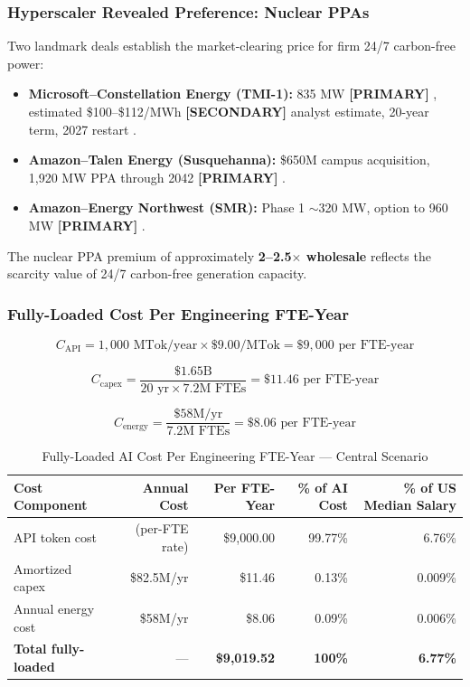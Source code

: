 \documentclass{article}
\newcommand{\PRIMARY}{\textbf{[PRIMARY]}}
\newcommand{\SECONDARY}{\textbf{[SECONDARY]}}
\begin{document}
\subsubsection*{Hyperscaler Revealed Preference: Nuclear PPAs}

Two landmark deals establish the market-clearing price for firm 24/7 carbon-free power:

\begin{itemize}
  \item \textbf{Microsoft--Constellation Energy (TMI-1):} 835 MW \PRIMARY{} \citep{constellation2024tmi}, estimated
    \$100--\$112/MWh \SECONDARY{} analyst estimate, 20-year term, 2027 restart \citep{constellation2024tmi}.
  \item \textbf{Amazon--Talen Energy (Susquehanna):} \$650M campus acquisition, 1,920 MW
    PPA through 2042 \PRIMARY{} \citep{talen2024susquehanna}.
  \item \textbf{Amazon--Energy Northwest (SMR):} Phase 1 $\sim$320 MW, option to 960 MW
    \PRIMARY{} \citep{amazon2024smr}.
\end{itemize}

The nuclear PPA premium of approximately \textbf{2--2.5$\times$ wholesale} reflects the
scarcity value of 24/7 carbon-free generation capacity.

\subsubsection{Fully-Loaded Cost Per Engineering FTE-Year}

\[
C_{\text{API}} = 1{,}000 \text{ MTok/year} \times \$9.00/\text{MTok} = \$9{,}000 \text{ per FTE-year}
\]

\[
C_{\text{capex}} = \frac{\$1.65\text{B}}{20 \text{ yr} \times 7.2\text{M FTEs}} = \$11.46 \text{ per FTE-year}
\]

\[
C_{\text{energy}} = \frac{\$58\text{M/yr}}{7.2\text{M FTEs}} = \$8.06 \text{ per FTE-year}
\]

\begin{table}[ht]
\centering
\caption{Fully-Loaded AI Cost Per Engineering FTE-Year --- Central Scenario}
\label{tab:fte-cost}
\small
\begin{tabular}{@{}lrrrr@{}}
\toprule
\textbf{Cost Component} & \textbf{Annual Cost} & \textbf{Per FTE-Year} & \textbf{\% of AI Cost} & \textbf{\% of US Median Salary} \\
\midrule
API token cost & (per-FTE rate) & \$9,000.00 & 99.77\% & 6.76\% \\
Amortized capex & \$82.5M/yr & \$11.46 & 0.13\% & 0.009\% \\
Annual energy cost & \$58M/yr & \$8.06 & 0.09\% & 0.006\% \\
\textbf{Total fully-loaded} & --- & \textbf{\$9,019.52} & \textbf{100\%} & \textbf{6.77\%} \\
\bottomrule
\end{tabular}
\end{table}
\end{document}
